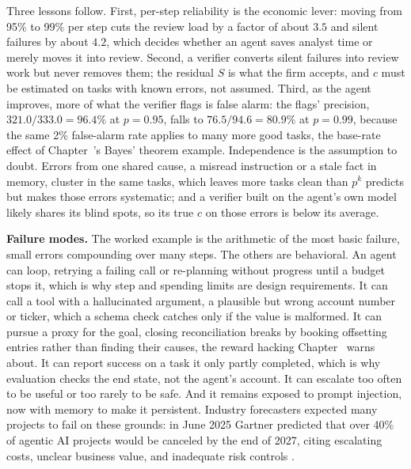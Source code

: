 \documentclass[../ai_in_finance]{subfiles}
\begin{document}
Three lessons follow. First, per-step reliability is the economic lever: moving from 95\% to 99\% per step cuts the review load by a factor of about $3.5$ and silent failures by about $4.2$, which decides whether an agent saves analyst time or merely moves it into review. Second, a verifier converts silent failures into review work but never removes them; the residual $S$ is what the firm accepts, and $c$ must be estimated on tasks with known errors, not assumed. Third, as the agent improves, more of what the verifier flags is false alarm: the flags' precision, $321.0/333.0 = 96.4\%$ at $p=0.95$, falls to $76.5/94.6 = 80.9\%$ at $p=0.99$, because the same 2\% false-alarm rate applies to many more good tasks, the base-rate effect of Chapter~'s Bayes' theorem example. Independence is the assumption to doubt. Errors from one shared cause, a misread instruction or a stale fact in memory, cluster in the same tasks, which leaves more tasks clean than $p^k$ predicts but makes those errors systematic; and a verifier built on the agent's own model likely shares its blind spots, so its true $c$ on those errors is below its average.

\textbf{Failure modes.} The worked example is the arithmetic of the most basic failure, small errors compounding over many steps. The others are behavioral. An agent can loop, retrying a failing call or re-planning without progress until a budget stops it, which is why step and spending limits are design requirements. It can call a tool with a hallucinated argument, a plausible but wrong account number or ticker, which a schema check catches only if the value is malformed. It can pursue a proxy for the goal, closing reconciliation breaks by booking offsetting entries rather than finding their causes, the reward hacking Chapter~ warns about. It can report success on a task it only partly completed, which is why evaluation checks the end state, not the agent's account. It can escalate too often to be useful or too rarely to be safe. And it remains exposed to prompt injection, now with memory to make it persistent. Industry forecasters expected many projects to fail on these grounds: in June 2025 Gartner predicted that over 40\% of agentic AI projects would be canceled by the end of 2027, citing escalating costs, unclear business value, and inadequate risk controls \parencite{gartner2025agentic}.
\end{document}
